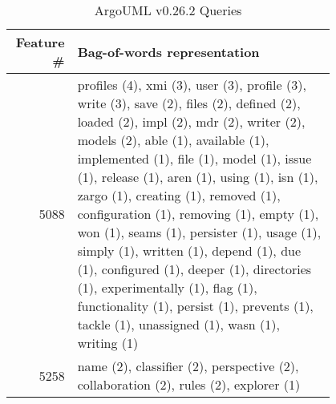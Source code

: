 \begin{table}[t]
\renewcommand{\arraystretch}{1.3}
\footnotesize
\centering
\caption{ArgoUML v0.26.2 Queries}
\begin{tabular}{r|p{0.8\linewidth}}
\toprule
Feature \# & Bag-of-words representation  \\
\midrule
5088       &

profiles (4),
xmi (3),
user (3),
profile (3),
write (3),
save (2),
files (2),
defined (2),
loaded (2),
impl (2),
mdr (2),
writer (2),
models (2),
able (1),
available (1),
implemented (1),
file (1),
model (1),
issue (1),
release (1),
aren (1),
using (1),
isn (1),
zargo (1),
creating (1),
removed (1),
configuration (1),
removing (1),
empty (1),
won (1),
seams (1),
persister (1),
usage (1),
simply (1),
written (1),
depend (1),
due (1),
configured (1),
deeper (1),
directories (1),
experimentally (1),
flag (1),
functionality (1),
persist (1),
prevents (1),
tackle (1),
unassigned (1),
wasn (1),
writing (1)

\\
5258       &

name (2),
classifier (2),
perspective (2),
collaboration (2),
rules (2),
explorer (1)

\\
\bottomrule
\end{tabular}
\label{table:argoumlqueries}
\end{table}

